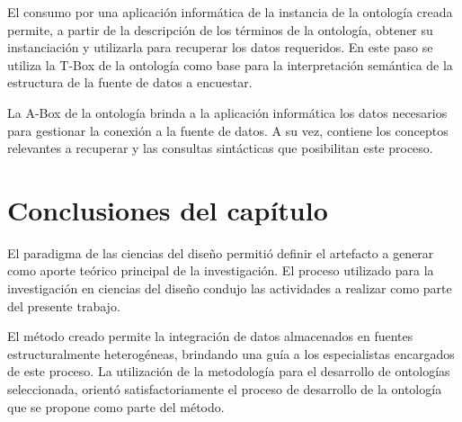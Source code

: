 El consumo por una aplicación informática de la instancia de la ontología creada permite, a partir de la descripción de los términos de la ontología, obtener su instanciación y utilizarla para recuperar los datos requeridos. En este paso se utiliza la T-Box de la ontología como base para la interpretación semántica de la estructura de la fuente de datos a encuestar.

La A-Box de la ontología brinda a la aplicación informática los datos necesarios para gestionar la conexión a la fuente de datos. A su vez, contiene los conceptos relevantes a recuperar y las consultas sintácticas que posibilitan este proceso.

\section{Conclusiones del capítulo}

El paradigma de las ciencias del diseño permitió definir el artefacto a generar como aporte teórico principal de la investigación. El proceso utilizado para la investigación en ciencias del diseño condujo las actividades a realizar como parte del presente trabajo.

El método creado permite la integración de datos almacenados en fuentes estructuralmente heterogéneas, brindando una guía a los especialistas encargados de este proceso. La utilización de la metodología para el desarrollo de ontologías seleccionada, orientó satisfactoriamente el proceso de desarrollo de la ontología que se propone como parte del método.





